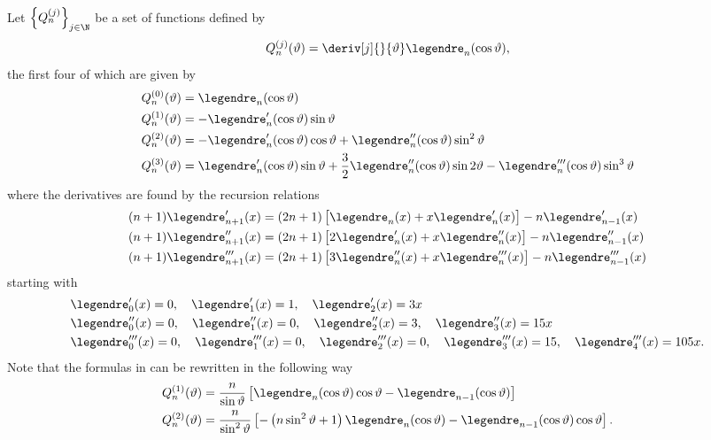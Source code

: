 Let $\left\{Q_n^{(j)}\right\}_{j\in\N}$ be a set of functions defined by
\begin{equation}
	Q_n^{(j)}(\vartheta) = \deriv[j]{}{\vartheta}\legendre_n(\cos\vartheta),
\end{equation}
the first four of which are given by
\begin{align}
\begin{split}\label{Eq1:Qs}
	Q_n^{(0)}(\vartheta) &= \legendre_n(\cos\vartheta)\\
	Q_n^{(1)}(\vartheta) &= - \legendre_n'(\cos\vartheta)\sin\vartheta\\
	Q_n^{(2)}(\vartheta) &= - \legendre_n'(\cos\vartheta)\cos\vartheta + \legendre_n''(\cos\vartheta)\sin^2\vartheta\\
	Q_n^{(3)}(\vartheta) &=  \legendre_n'(\cos\vartheta)\sin\vartheta  +\frac32 \legendre_n''(\cos\vartheta)\sin 2\vartheta - \legendre_n'''(\cos\vartheta)\sin^3\vartheta\\
	\end{split}
\end{align}
where the derivatives are found by the recursion relations
\begin{align}
	&(n+1)\legendre_{n+1}'(x)=(2n+1)\left[\legendre_n(x)+x \legendre_n'(x)\right]-n\legendre_{n-1}'(x)\\
	&(n+1)\legendre_{n+1}''(x)=(2n+1)\left[2\legendre_n'(x)+ x\legendre_n''(x)\right]-n\legendre_{n-1}''(x)\\
	&(n+1)\legendre_{n+1}'''(x)=(2n+1)\left[3\legendre_n''(x)+x \legendre_n'''(x)\right]-n\legendre_{n-1}'''(x)
\end{align}
starting with 
\begin{align*}
	&\legendre_0'(x) = 0,\quad \legendre_1'(x) = 1, \quad \legendre_2'(x) = 3x\\
	&\legendre_0''(x) = 0,\quad \legendre_1''(x) = 0, \quad \legendre_2''(x) = 3, \quad \legendre_3''(x) = 15x\\
	&\legendre_0'''(x) = 0,\quad \legendre_1'''(x) = 0, \quad \legendre_2'''(x) = 0, \quad \legendre_3'''(x) = 15, \quad \legendre_4'''(x) = 105x.
\end{align*}
Note that the formulas in  can be rewritten in the following way
\begin{align}
	Q_n^{(1)}(\vartheta) &= \frac{n}{\sin\vartheta} \left[ \legendre_n(\cos\vartheta)\cos\vartheta - \legendre_{n-1}(\cos\vartheta)\right]\\
	Q_n^{(2)}(\vartheta) &= \frac{n}{\sin^2\vartheta} \left[-\left(n\sin^2\vartheta+1 \right)\legendre_n(\cos\vartheta) -  \legendre_{n-1}(\cos\vartheta)\cos\vartheta\right].
\end{align}
